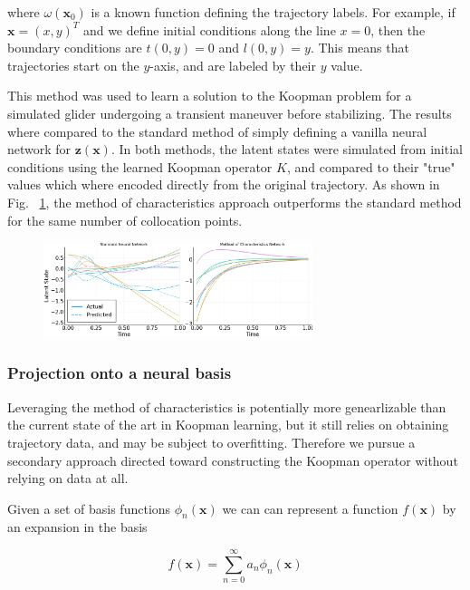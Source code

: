 \documentclass[12pt, letterpaper]{article}
\begin{document}
where $\omega(\mathbf{x}_0)$ is a known function defining the trajectory labels.  For example, if $\mathbf{x} = (x, y)^T$ and we define initial conditions along the line $x = 0$, then the boundary conditions are $t(0,y) = 0$ and $l(0,y) = y$.  This means that trajectories start on the $y$-axis, and are labeled by their $y$ value.

This method was used to learn a solution to the Koopman problem for a simulated glider undergoing a transient maneuver before stabilizing.  The results where compared to the standard method of simply defining a vanilla neural network for $\mathbf{z}(\mathbf{x})$.  In both methods, the latent states were simulated from initial conditions using the learned Koopman operator $K$, and compared to their "true" values which where encoded directly from the original trajectory.  As shown in Fig. ~\ref{fig:method_of_characteristics}, the method of characteristics approach outperforms the standard method for the same number of collocation points.  

\begin{figure}[hbt!]
\centering
\includegraphics[width=0.7\textwidth]{figures/method_of_characteristics.png}
\caption{}
\label{fig:method_of_characteristics}
\end{figure}

\subsubsection{Projection onto a neural basis}

Leveraging the method of characteristics is potentially more genearlizable than the current state of the art in Koopman learning, but it still relies on obtaining trajectory data, and may be subject to overfitting.  Therefore we pursue a secondary approach directed toward constructing the Koopman operator without relying on data at all.

Given a set of basis functions $\phi_n(\mathbf{x})$ we can can represent a function $f(\mathbf{x})$ by an expansion in the basis

\begin{equation}
    f(\mathbf{x}) = \overset{\infty}{\underset{n=0}{\sum}} a_n \phi_n(\mathbf{x})
\end{equation}
\end{document}

